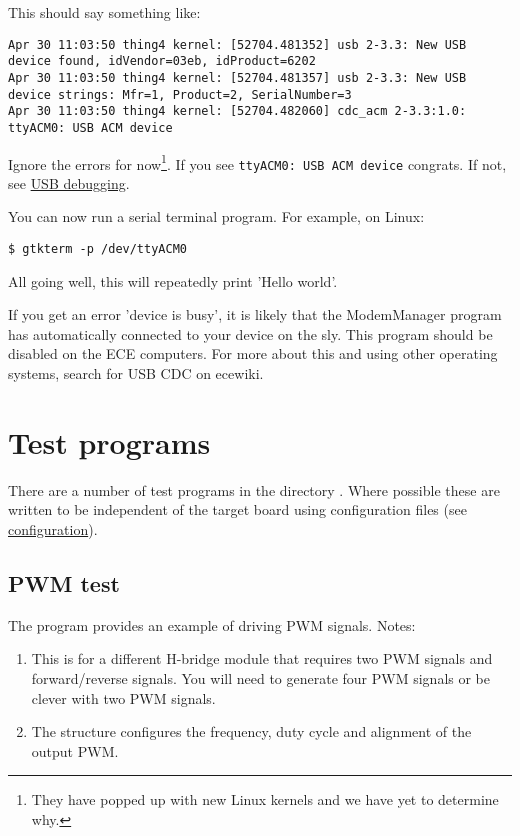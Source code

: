 This should say something like:
%
\begin{verbatim}
Apr 30 11:03:50 thing4 kernel: [52704.481352] usb 2-3.3: New USB device found, idVendor=03eb, idProduct=6202
Apr 30 11:03:50 thing4 kernel: [52704.481357] usb 2-3.3: New USB device strings: Mfr=1, Product=2, SerialNumber=3
Apr 30 11:03:50 thing4 kernel: [52704.482060] cdc_acm 2-3.3:1.0: ttyACM0: USB ACM device
\end{verbatim}

Ignore the errors for now\footnote{They have popped up with new Linux
  kernels and we have yet to determine why.}. If you see
\texttt{ttyACM0:\ USB\ ACM\ device} congrats. If not, see
\href{USB_debugging}{USB debugging}.

You can now run a serial terminal program. For example, on Linux:

\begin{verbatim}
$ gtkterm -p /dev/ttyACM0
\end{verbatim}

All going well, this will repeatedly print 'Hello world'.

If you get an error 'device is busy', it is likely that the ModemManager
program has automatically connected to your device on the sly. This
program should be disabled on the ECE computers. For more about this and
using other operating systems, search for USB CDC on ecewiki.

\section{Test programs}
\label{test-programs}

There are a number of test programs in the directory
. Where possible these are written to be
independent of the target board using configuration files (see
\protect\hyperref[configuration]{configuration}).

\subsection{PWM test}
\label{pwm-test}

The program  provides an
example of driving PWM signals. Notes:
%
\begin{enumerate}
\item
  This is for a different H-bridge module that requires two PWM signals
  and forward/reverse signals. You will need to generate four PWM
  signals or be clever with two PWM signals.
\item
  The  structure configures the frequency, duty
  cycle and alignment of the output PWM.
\end{enumerate}

